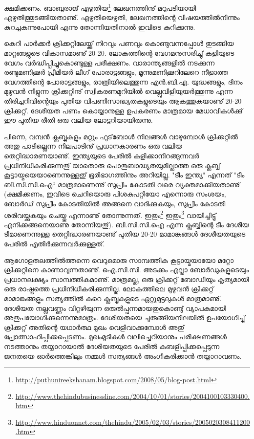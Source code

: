 ﻿
\vskip 2pt

ക്ഷമിക്കണം. ബാബുരാജ് എഴുതിയ\footnote{\url{http://puthunireekshanam.blogspot.com/2008/05/blog-post.html}} 
ലേഖനത്തിനു് മറുപടിയായി എഴുതിത്തുടങ്ങിയതാണു്. എഴുതിയെഴുതി, ലേഖനത്തിന്റെ വിഷയത്തില്‍നിന്നും കുറച്ചകന്നുപോയി 
എന്നു തോന്നിയതിനാല്‍ ഇവിടെ കുറിക്കുന്നു. 

കെറി പാര്‍ക്കര്‍ ക്രിക്കറ്റിലേയ്ക്കു് നിറവും പണവും കൊണ്ടുവന്നപ്പോള്‍ തുടങ്ങിയ മാറ്റങ്ങളുടെ വികാസമാണു് 20-20. 
ലോകത്തിന്റെ വേഗമനുസരിച്ചു് കളിയുടെ വേഗം വര്‍ദ്ധിപ്പിച്ചുകൊണ്ടുള്ള പരീക്ഷണം. വാരാന്ത്യങ്ങളില്‍ നടക്കുന്ന 
രണ്ടുമണിക്കൂര്‍ പ്രീമിയര്‍ ലീഗ് പോരാട്ടങ്ങളും, മൂന്നുമണിക്കൂറിലേറെ നീളാത്ത വേഗത്തിന്റെ പോരാട്ടങ്ങളും, 
രാത്രിയിലെത്തുന്ന എന്‍.ബി.എ. യുദ്ധങ്ങളും, ദിനം മുഴുവന്‍ നീളുന്ന ക്രിക്കറ്റിനു് സ്വീകരണമുറിയില്‍ വെല്ലുവിളിയുയര്‍ത്തുന്നു 
എന്ന തിരിച്ചറിവിന്റെയും പുതിയ വിപണിസാദ്ധ്യതകളുടെയും ആകത്തുകയാണു് 20-20 ക്രിക്കറ്റ്. 
ദേശീയത പണം കൊയ്യാനുള്ള ഉപകരണം മാത്രമായ മേധാവികള്‍ക്കു് ഈ പുതിയ രീതി ഒരു വലിയ ലോട്ടറിയായിരുന്നു.

പിന്നെ, വമ്പന്‍ ക്ലബ്ബുകളും മറ്റും ഫുട്‌ബോള്‍ നിലങ്ങള്‍ വാഴുമ്പോള്‍ ക്രിക്കറ്റില്‍ അതു പാടില്ലെന്ന നിലപാടിനു് 
പ്രധാനകാരണം ഒരു വലിയ തെറ്റിദ്ധാരണയാണു്. ഇന്ത്യയുടെ പേരില്‍ കളിക്കാനിറങ്ങുന്നവര്‍ പ്രധിനിധീകരിക്കുന്നതു് 
യാതൊരു പൊതുബാദ്ധ്യതയുമില്ലാത്ത ഒരു ക്ലബ്ബ് കൂട്ടായ്മയെയാണെന്നുള്ളതു് ഭൂരിഭാഗത്തിനും അറിയില്ല. "ടീം ഇന്ത്യ" എന്നത് "ടീം ബി.സി.സി.ഐ`` 
മാത്രമാണെന്നു് സുപ്രീം കോടതി വരെ വ്യക്തമാക്കിയതാണു് (ക്ഷമിക്കണം, ഇവിടെ ചെറിയൊരു പിശകുപറ്റിയോ എന്നൊരു സംശയം, 
ബോര്‍ഡ് സുപ്രീം കോടതിയില്‍ അങ്ങനെ വാദിക്കുകയും, സുപ്രീം കോടതി ശരിവയ്ക്കുകയും ചെയ്തു എന്നാണു് തോന്നുന്നത്. 
ഇതും\footnote{\url{http://www.thehindubusinessline.com/2004/10/01/stories/2004100103330400.htm}} 
ഇതും\footnote{\url{http://www.hinduonnet.com/thehindu/2005/02/03/stories/2005020308411200.htm}} 
വായിച്ചിട്ടു് എനിക്കങ്ങനെയാണു തോന്നിയതു്). ബി.സി.സി.ഐ എന്ന ക്ലബ്ബിന്റെ ടീം ദേശീയ ടീമാണെന്നുള്ള 
തെറ്റിദ്ധാരണയാണു് പുതിയ 20-20 മാമാങ്കങ്ങള്‍ ദേശീയതയുടെ പേരില്‍ എതിര്‍ക്കുന്നവര്‍ക്കുള്ളത്.

ആഗോളതലത്തില്‍ത്തന്നെ വെറുമൊരു സാമ്പത്തിക കൂട്ടായ്മയായോ മറ്റോ ക്രിക്കറ്റിനെ കാണാവുന്നതാണു്. 
ഐ.സി.സി. അടക്കം എല്ലാ ബോര്‍ഡുകളുടെയും പ്രധാനലക്ഷ്യം സാമ്പത്തികമാണു്. മാത്രമല്ല, ഒരു ക്രിക്കറ്റ് ബോഡിയും 
കൃത്യമായി ഒരു രാഷ്ട്രത്തെ പ്രധിനിധീകരിക്കുന്നില്ല. ലോകത്തിലെ മുഴുവന്‍ ക്രിക്കറ്റ് മാമാങ്കങ്ങളും സത്യത്തില്‍ കുറെ 
ക്ലബ്ബുകളുടെ ഏറ്റുമുട്ടലുകള്‍ മാത്രമാണു്. ദേശീയത നല്ലവണ്ണം വിറ്റഴിയുന്ന ഒരുല്‍പ്പന്നമായതുകൊണ്ടു് വ്യാപകമായി 
അതുപയോഗിക്കുന്നെന്നുമാത്രം. ദേശീയതയെ ചുരുങ്ങിയനിലയില്‍ ഉപയോഗിച്ചു് ക്രിക്കറ്റ് അതിന്റെ യഥാര്‍ത്ഥ മുഖം 
വെളിവാക്കുമ്പോള്‍ അതു് പ്രോത്സാഹിപ്പിക്കപ്പെടണം. മുഖംമൂടികള്‍ വലിച്ചെറിയാനും പരീക്ഷണങ്ങള്‍ നടത്താനും 
തയ്യാറായാല്‍ ദേശീയതയുടെ പേരില്‍ കബളിപ്പിക്കപ്പെടുന്ന ജനതയെ ഓര്‍ത്തെങ്കിലും നമ്മള്‍ സത്യങ്ങള്‍ അംഗീകരിക്കാന്‍ 
തയ്യാറാവണം.

